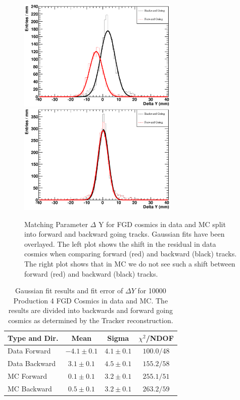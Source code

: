 \begin{figure}[h]
\centering
\includegraphics[width=3in]{Figures/Systematics/MatchingEfficiency/datadY.eps}
\includegraphics[width=3in]{Figures/Systematics/MatchingEfficiency/mcdY.eps}
\caption{
Matching Parameter $\Delta$ Y for FGD cosmics in data and MC split into forward and backward going tracks. Gaussian fits have been overlayed. The left plot shows the shift in the residual in data cosmics when comparing forward (red) and backward (black) tracks. The right plot shows that in MC we do not see such a shift between forward (red) and backward (black) tracks.
}
\label{fig:dY}
\end{figure}

\begin{table}[h]
\caption{Gaussian fit results and fit error of $\Delta Y$ for 10000 Production 4 FGD Cosmics in data and MC. The results are divided into backwards and forward going cosmics as determined by the Tracker reconstruction.}
\centering
\begin{tabular}{lccc}\toprule\midrule
Type and Dir. &  Mean & Sigma & $\chi^2$/NDOF \\ \midrule
Data Forward & $-4.1\pm 0.1$ & $4.1\pm 0.1$ & $100.0/48$  \\
\midrule
Data Backward & $3.1\pm 0.1$ & $4.5\pm 0.1$ & $155.2/58$ \\
\midrule
MC Forward & $0.1\pm 0.1$ & $3.2\pm 0.1$ & $255.1/51$ \\
\midrule
MC Backward & $0.5\pm 0.1$ & $3.2\pm 0.1$ & $263.2/59$ \\
\bottomrule
\end{tabular}
\label{tab:FitdY}
\end{table}

